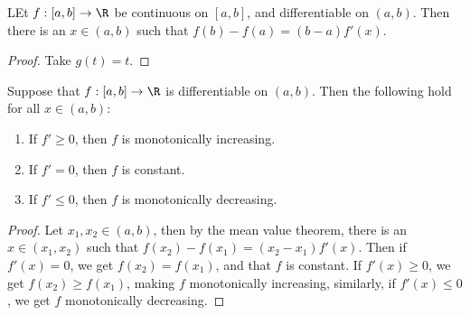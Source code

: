 \begin{corollary}
    LEt $f:[a,b] \rightarrow \R$ be continuous on  $[a,b]$, and differentiable on  $(a,b)$. Then 
    there is an $x \in (a,b)$ such that $f(b)-f(a)=(b-a)f'(x)$.
\end{corollary}
\begin{proof}
    Take $g(t)=t$.
\end{proof}

\begin{theorem}\label{6.2.3}
    Suppose that $f:[a,b] \rightarrow \R$ is differentiable on  $(a,b)$. Then the following hold 
    for all $x \in (a,b)$:
         \begin{enumerate}[label=(\arabic*)]
             \item If $f' \geq 0$, then $f$ is monotonically increasing.

             \item If  $f'=0$, then  $f$ is constant.

             \item If  $f' \leq 0$, then  $f$ is monotonically decreasing.
        \end{enumerate}
\end{theorem}
\begin{proof}
    Let $x_1,x_2 \in (a,b)$, then by the mean value theorem, there is an $x \in (x_1,x_2)$ 
    such that $f(x_2)-f(x_1)=(x_2-x_1)f'(x)$. Then if $f'(x)=0$, we get  $f(x_2)=f(x_1)$, and that 
    $f$ is constant. If $f'(x) \geq 0$, we get  $f(x_2) \geq f(x_1)$, making $f$ monotonically increasing, 
    similarly, if  $f'(x) \leq 0$, we get  $f$ monotonically decreasing.
\end{proof}
